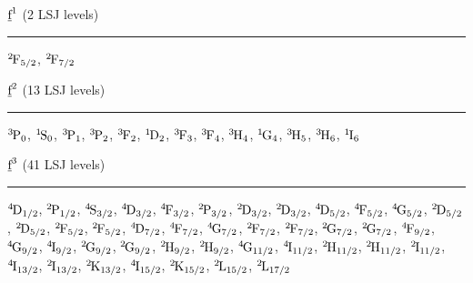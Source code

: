 \begin{mdframed}
\begin{center}
$\forb^{1}$
(2 LSJ levels)
\vspace{0.25cm}
\hrule
\vspace{0.25cm}

$\LSJterm{2}{F}{5/2}$, $\LSJterm{2}{F}{7/2}$
\end{center}
\end{mdframed}


\begin{mdframed}
\begin{center}
$\forb^{2}$
(13 LSJ levels)
\vspace{0.25cm}
\hrule
\vspace{0.25cm}

$\LSJterm{3}{P}{0}$, $\LSJterm{1}{S}{0}$, $\LSJterm{3}{P}{1}$, $\LSJterm{3}{P}{2}$, $\LSJterm{3}{F}{2}$, $\LSJterm{1}{D}{2}$, $\LSJterm{3}{F}{3}$, $\LSJterm{3}{F}{4}$, $\LSJterm{3}{H}{4}$, $\LSJterm{1}{G}{4}$, $\LSJterm{3}{H}{5}$, $\LSJterm{3}{H}{6}$, $\LSJterm{1}{I}{6}$
\end{center}
\end{mdframed}


\begin{mdframed}
\begin{center}
$\forb^{3}$
(41 LSJ levels)
\vspace{0.25cm}
\hrule
\vspace{0.25cm}

$\LSJterm{4}{D}{1/2}$, $\LSJterm{2}{P}{1/2}$, $\LSJterm{4}{S}{3/2}$, $\LSJterm{4}{D}{3/2}$, $\LSJterm{4}{F}{3/2}$, $\LSJterm{2}{P}{3/2}$, $\LSJterm{2}{D}{3/2}$, $\LSJterm{2}{D}{3/2}$, $\LSJterm{4}{D}{5/2}$, $\LSJterm{4}{F}{5/2}$, $\LSJterm{4}{G}{5/2}$, $\LSJterm{2}{D}{5/2}$, $\LSJterm{2}{D}{5/2}$, $\LSJterm{2}{F}{5/2}$, $\LSJterm{2}{F}{5/2}$, $\LSJterm{4}{D}{7/2}$, $\LSJterm{4}{F}{7/2}$, $\LSJterm{4}{G}{7/2}$, $\LSJterm{2}{F}{7/2}$, $\LSJterm{2}{F}{7/2}$, $\LSJterm{2}{G}{7/2}$, $\LSJterm{2}{G}{7/2}$, $\LSJterm{4}{F}{9/2}$, $\LSJterm{4}{G}{9/2}$, $\LSJterm{4}{I}{9/2}$, $\LSJterm{2}{G}{9/2}$, $\LSJterm{2}{G}{9/2}$, $\LSJterm{2}{H}{9/2}$, $\LSJterm{2}{H}{9/2}$, $\LSJterm{4}{G}{11/2}$, $\LSJterm{4}{I}{11/2}$, $\LSJterm{2}{H}{11/2}$, $\LSJterm{2}{H}{11/2}$, $\LSJterm{2}{I}{11/2}$, $\LSJterm{4}{I}{13/2}$, $\LSJterm{2}{I}{13/2}$, $\LSJterm{2}{K}{13/2}$, $\LSJterm{4}{I}{15/2}$, $\LSJterm{2}{K}{15/2}$, $\LSJterm{2}{L}{15/2}$, $\LSJterm{2}{L}{17/2}$
\end{center}
\end{mdframed}


